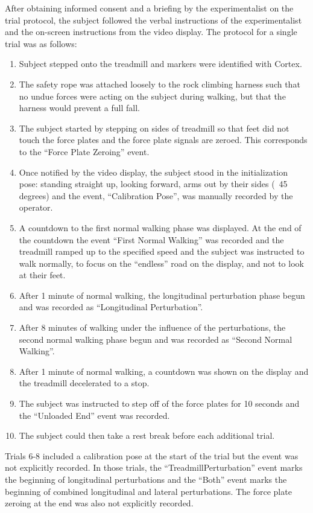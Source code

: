 \documentclass[fleqn,10pt]{wlpeerj}
\begin{document}
After obtaining informed consent and a briefing by the experimentalist on the
trial protocol, the subject followed the verbal instructions of the
experimentalist and the on-screen instructions from the video display. The
protocol for a single trial was as follows:
%
\begin{enumerate}
  \item Subject stepped onto the treadmill and markers were identified with
    Cortex.
  \item The safety rope was attached loosely to the rock climbing harness such
    that no undue forces were acting on the subject during walking, but that
    the harness would prevent a full fall.
  \item The subject started by stepping on sides of treadmill so that feet did
    not touch the force plates and the force plate signals are zeroed. This
    corresponds to the ``Force Plate Zeroing'' event.
  \item Once notified by the video display, the subject stood in the
    initialization pose: standing straight up, looking forward, arms out by
    their sides (~45 degrees) and the event, ``Calibration Pose'', was manually
    recorded by the operator.
  \item A countdown to the first normal walking phase was displayed. At the end
    of the countdown the event ``First Normal Walking'' was recorded and the
    treadmill ramped up to the specified speed and the subject was instructed
    to walk normally, to focus on the ``endless'' road on the display, and not
    to look at their feet.
  \item After 1 minute of normal walking, the longitudinal perturbation phase
    begun and was recorded as ``Longitudinal Perturbation''.
  \item After 8 minutes of walking under the influence of the perturbations,
    the second normal walking phase begun and was recorded as ``Second Normal
    Walking''.
  \item After 1 minute of normal walking, a countdown was shown on the display
    and the treadmill decelerated to a stop.
  \item The subject was instructed to step off of the force plates for 10
    seconds and the ``Unloaded End'' event was recorded.
  \item The subject could then take a rest break before each additional trial.
\end{enumerate}

Trials 6-8 included a calibration pose at the start of the trial but the event
was not explicitly recorded. In those trials, the ``TreadmillPerturbation''
event marks the beginning of longitudinal perturbations and the ``Both'' event
marks the beginning of combined longitudinal and lateral perturbations. The
force plate zeroing at the end was also not explicitly recorded.
\end{document}
